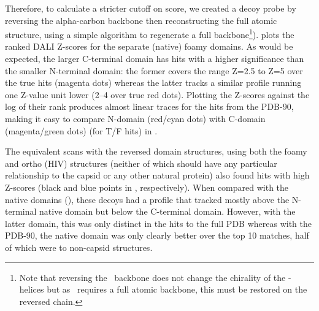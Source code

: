 Therefore, to calculate a stricter cutoff on score, we created a decoy probe by reversing the
alpha-carbon backbone then reconstructing the full atomic structure, using a simple algorithm
to regenerate a full backbone\footnote{
Note that reversing the \CA\ backbone does not change the chirality of the \A-helices
but as \DALI\ requires a full atomic backbone, this must be restored on the reversed chain.
}).
 plots the ranked DALI Z-scores for the separate (native) foamy domains.
As would be expected, the larger C-terminal domain has hits with a higher significance than the
smaller N-terminal domain:  the former covers the range Z=2.5 to Z=5 over the true hits (magenta
dots) whereas the latter tracks a similar profile running one Z-value unit lower (2--4 over true
red dots).  Plotting the Z-scores against the log of their rank produces almost linear traces
for the hits from the PDB-90, making it easy to compare N-domain (red/cyan dots) with C-domain 
(magenta/green dots) (for T/F hits) in .

The equivalent scans with the reversed domain structures, using both the foamy and ortho (HIV) structures 
(neither of which should have any particular relationship to the capsid or any other natural protein)
also found hits with high Z-scores (black and blue points in , respectively).
When compared with the native domains (), these decoys had a profile that tracked mostly above
the N-terminal native domain but below the C-terminal domain.  However, with the latter domain, this
was only distinct in the hits to the full PDB whereas with the PDB-90, the native domain was only clearly 
better over the top 10 matches, half of which were to non-capsid structures.

 
